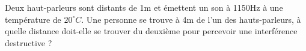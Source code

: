%
%
    Deux haut-parleurs sont distants de 1m et émettent un son à 1150Hz à une température de \(20^\circ C\). Une personne se trouve à 4m de l'un des hauts-parleurs, à quelle distance doit-elle se trouver du deuxième pour percevoir une interférence destructive ?
